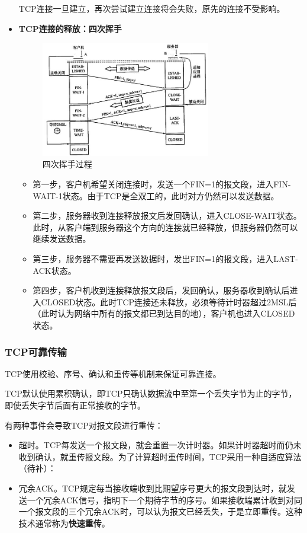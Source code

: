 \documentclass[12pt, a4paper, oneside]{ctexart}
\begin{document}
\begin{itemize}
    TCP连接一旦建立，再次尝试建立连接将会失败，原先的连接不受影响。
    \item {\bf TCP连接的释放：四次挥手}
    \begin{figure}[h]
        \centering
        \includegraphics[width=0.7\textwidth]{./images/tcp_free.jpg}
        \caption{四次挥手过程}
    \end{figure}
    \begin{itemize}
        \item 第一步，客户机希望关闭连接时，发送一个FIN=1的报文段，进入FIN-WAIT-1状态。由于TCP是全双工的，此时对方仍然可以发送数据。
        \item 第二步，服务器收到连接释放报文后发回确认，进入CLOSE-WAIT状态。此时，从客户端到服务器这个方向的连接就已经释放，但服务器仍然可以继续发送数据。
        \item 第三步，服务器不需要再发送数据时，发出FIN=1的报文段，进入LAST-ACK状态。
        \item 第四步，客户机收到连接释放报文段后，发回确认，服务器收到确认后进入CLOSED状态。此时TCP连接还未释放，必须等待计时器超过2MSL后（此时认为网络中所有的报文都已到达目的地），客户机也进入CLOSED状态。
    \end{itemize}
\end{itemize}

\subsubsection{TCP可靠传输}

TCP使用校验、序号、确认和重传等机制来保证可靠连接。

TCP默认使用累积确认，即TCP只确认数据流中至第一个丢失字节为止的字节，即使丢失字节后面有正常接收的字节。

有两种事件会导致TCP对报文段进行重传：
\begin{itemize}
    \item 超时。TCP每发送一个报文段，就会重置一次计时器。如果计时器超时而仍未收到确认，就重传报文段。为了计算超时重传时间，TCP采用一种自适应算法（待补）：
    \item 冗余ACK。TCP规定每当接收端收到比期望序号更大的报文段到达时，就发送一个冗余ACK信号，指明下一个期待字节的序号。如果接收端累计收到对同一个报文段的三个冗余ACK时，可以认为报文已经丢失，于是立即重传。这种技术通常称为\textbf{快速重传}。
\end{itemize}
\end{document}
